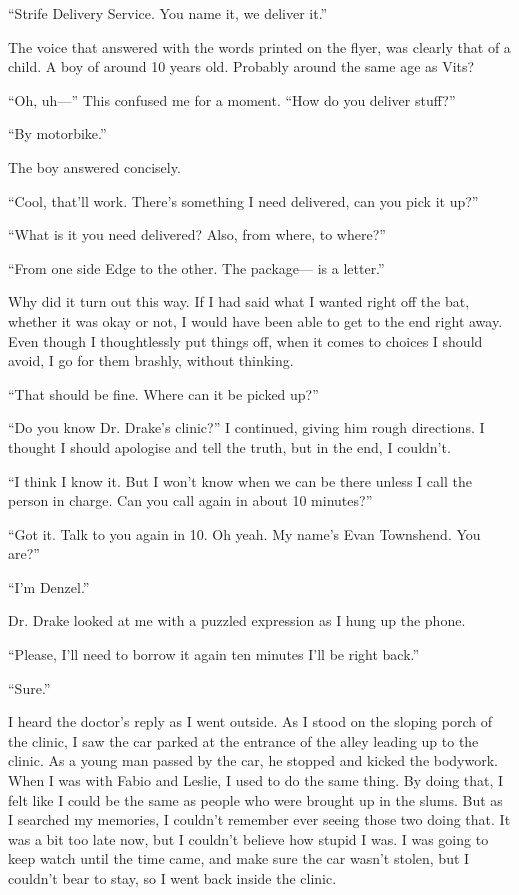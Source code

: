 \documentclass[oneside]{book}
\begin{document}
“Strife Delivery Service. You name it, we deliver it.”

The voice that answered with the words printed on the flyer, was clearly that of a child. A boy of around 10 years old. Probably around the same age as Vits?

“Oh, uh—” This confused me for a moment. “How do you deliver stuff?”

“By motorbike.”

The boy answered concisely.

“Cool, that’ll work. There’s something I need delivered, can you pick it up?”

“What is it you need delivered? Also, from where, to where?”

“From one side Edge to the other. The package— is a letter.”

Why did it turn out this way. If I had said what I wanted right off the bat, whether it was okay or not, I would have been able to get to the end right away. Even though I thoughtlessly put things off, when it comes to choices I should avoid, I go for them brashly, without thinking.

“That should be fine. Where can it be picked up?”

“Do you know Dr. Drake’s clinic?” I continued, giving him rough directions. I thought I should apologise and tell the truth, but in the end, I couldn’t.

“I think I know it. But I won’t know when we can be there unless I call the person in charge. Can you call again in about 10 minutes?”

“Got it. Talk to you again in 10. Oh yeah. My name’s Evan Townshend. You are?”

“I’m Denzel.”

Dr. Drake looked at me with a puzzled expression as I hung up the phone.

“Please, I’ll need to borrow it again ten minutes I’ll be right back.”

“Sure.”

I heard the doctor’s reply as I went outside. As I stood on the sloping porch of the clinic, I saw the car parked at the entrance of the alley leading up to the clinic. As a young man passed by the car, he stopped and kicked the bodywork. When I was with Fabio and Leslie, I used to do the same thing. By doing that, I felt like I could be the same as people who were brought up in the slums. But as I searched my memories, I couldn’t remember ever seeing those two doing that. It was a bit too late now, but I couldn’t believe how stupid I was. I was going to keep watch until the time came, and make sure the car wasn’t stolen, but I couldn’t bear to stay, so I went back inside the clinic.
\end{document}
